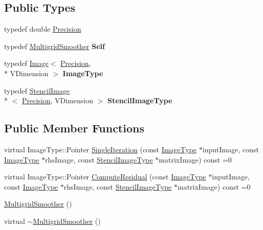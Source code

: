 \subsection*{Public Types}
\begin{DoxyCompactItemize}
\item 
typedef double \hyperlink{classitk_1_1mad_1_1_multigrid_smoother_a23c762f89a3b1509f0a64cfd42e82427}{Precision}
\item 
\hypertarget{classitk_1_1mad_1_1_multigrid_smoother_ad1261cf9fae2f872d29767e15bfcd0b0}{typedef \hyperlink{classitk_1_1mad_1_1_multigrid_smoother}{Multigrid\-Smoother} {\bfseries Self}}\label{classitk_1_1mad_1_1_multigrid_smoother_ad1261cf9fae2f872d29767e15bfcd0b0}

\item 
\hypertarget{classitk_1_1mad_1_1_multigrid_smoother_adf26b2e9c62c3bd6106b30f0b0f1d643}{typedef \hyperlink{class_image}{Image}$<$ \hyperlink{classitk_1_1mad_1_1_multigrid_smoother_a23c762f89a3b1509f0a64cfd42e82427}{Precision}, \\*
V\-Dimension $>$ {\bfseries Image\-Type}}\label{classitk_1_1mad_1_1_multigrid_smoother_adf26b2e9c62c3bd6106b30f0b0f1d643}

\item 
\hypertarget{classitk_1_1mad_1_1_multigrid_smoother_ad3c31fa3229d0e0f9c7db051dd624475}{typedef \hyperlink{classitk_1_1mad_1_1_stencil_image}{Stencil\-Image}\\*
$<$ \hyperlink{classitk_1_1mad_1_1_multigrid_smoother_a23c762f89a3b1509f0a64cfd42e82427}{Precision}, V\-Dimension $>$ {\bfseries Stencil\-Image\-Type}}\label{classitk_1_1mad_1_1_multigrid_smoother_ad3c31fa3229d0e0f9c7db051dd624475}

\end{DoxyCompactItemize}
\subsection*{Public Member Functions}
\begin{DoxyCompactItemize}
\item 
virtual Image\-Type\-::\-Pointer \hyperlink{classitk_1_1mad_1_1_multigrid_smoother_a1163b85294e86ee03990020bc81fe465}{Single\-Iteration} (const \hyperlink{class_image}{Image\-Type} $\ast$input\-Image, const \hyperlink{class_image}{Image\-Type} $\ast$rhs\-Image, const \hyperlink{classitk_1_1mad_1_1_stencil_image}{Stencil\-Image\-Type} $\ast$matrix\-Image) const =0
\item 
virtual Image\-Type\-::\-Pointer \hyperlink{classitk_1_1mad_1_1_multigrid_smoother_a7b90d4fbff488ad00ed0bd680913f227}{Compute\-Residual} (const \hyperlink{class_image}{Image\-Type} $\ast$input\-Image, const \hyperlink{class_image}{Image\-Type} $\ast$rhs\-Image, const \hyperlink{classitk_1_1mad_1_1_stencil_image}{Stencil\-Image\-Type} $\ast$matrix\-Image) const =0
\item 
\hyperlink{classitk_1_1mad_1_1_multigrid_smoother_a4b022644c398078c92ac26323df6eae4}{Multigrid\-Smoother} ()
\item 
virtual \hyperlink{classitk_1_1mad_1_1_multigrid_smoother_a853383223dfa14c417e2788d1a3558fd}{$\sim$\-Multigrid\-Smoother} ()
\end{DoxyCompactItemize}


